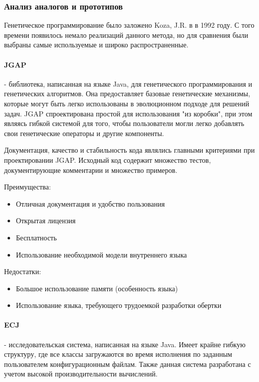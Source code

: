 \documentclass[russian,utf8,emptystyle]{eskdtext}
\begin{document}
\begin{spacing}{1.5}
\subsubsection{Анализ аналогов и прототипов}
Генетическое программирование было заложено Koza, J.R. в \cite{KozaTheBase} в 1992 году. С того времени появилось немало реализаций данного метода, но для сравнения были выбраны самые используемые и широко распространенные.

\paragraph{JGAP} - библиотека, написанная на языке Java, для генетического программирования и генетических алгоритмов. Она предоставляет базовые генетические механизмы, которые могут быть легко использованы в эволюционном подходе для решений задач. JGAP спроектирована простой для использования "из коробки", при этом являясь гибкой системой для того, чтобы пользователи могли легко добавлять свои генетические операторы и другие компоненты.

Документация, качество и стабильность кода являлись главными критериями при проектировании JGAP. Исходный код содержит множество тестов, документирующие комментарии и множество примеров.

Преимущества:
\begin{itemize}
\item Отличная документация и удобство пользования
\item Открытая лицензия
\item Бесплатность
\item Использование необходимой модели внутреннего языка
\end{itemize}

Недостатки:
\begin{itemize}
\item Большое использование памяти (особенность языка)
\item Использование языка, требующего трудоемкой разработки обертки 
\end{itemize}

\paragraph{ECJ} - исследовательская система, написанная на языке Java. Имеет крайне гибкую структуру, где все классы загружаются во время исполнения по заданным пользователем конфигурационным файлам. Также данная система разработана с учетом высокой производительности вычислений.


\end{spacing}
\end{document}
